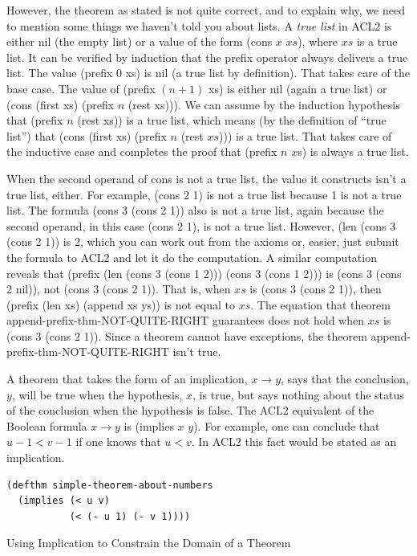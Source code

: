 However, the theorem as stated
is not quite correct,
and to explain why, we need to mention
some things we haven't told you about lists.
\label{true-list-def}
A \emph{true list} in ACL2 is either nil (the empty list)
or a value of the form (cons $x$ $xs$),
where $xs$ is a true list.
It can be verified by induction that
the prefix operator always delivers a true list.
The value (prefix 0 xs) is nil (a true list by definition).
That takes care of the base case.
The value of (prefix $(n+1)$ xs) is either nil (again a true list)
or (cons (first xs) (prefix $n$ (rest xs))).
We can assume by the induction hypothesis that
(prefix $n$ (rest xs)) is a true list,
which means (by the definition of ``true list'')
that (cons (first xs) (prefix $n$ (rest $xs$))) is a true list.
That takes care of the inductive case and completes the proof
that (prefix $n$ $x$s) is always a true list.

When the second operand of cons is not a true list,
the value it constructs isn't a true list, either.
For example, (cons 2 1) is not a true list because 1 is not a true list.
The formula (cons 3 (cons 2 1)) also is not a true list,
again because the second operand,
in this case (cons 2 1), is not a true list.
However, (len (cons 3 (cons 2 1)) is 2, which you can work
out from the axioms or, easier,
just submit the formula to ACL2 and let it do the computation.
A similar computation reveals that
(prefix (len (cons 3 (cons 1 2))) (cons 3 (cons 1 2)))
is (cons 3 (cons 2 nil)), not (cons 3 (cons 2 1)).
That is, when $xs$ is (cons 3 (cons 2 1)),
then (prefix (len xs) (append xs ys)) is not equal to $xs$.
The equation that theorem append-prefix-thm-NOT-QUITE-RIGHT
guarantees does not hold when $xs$ is (cons 3 (cons 2 1)).
Since a theorem cannot have exceptions,
the theorem append-prefix-thm-NOT-QUITE-RIGHT
isn't true.

\begin{aside}
A theorem that takes the form of an implication, $x \rightarrow y$,
says that the conclusion, $y$, will be true when the hypothesis, $x$,
is true, but says nothing about the status of the conclusion when
the hypothesis is false. The ACL2 equivalent of the Boolean formula $x \rightarrow y$
is (implies $x$ $y$).
For example, one can conclude that $u - 1 < v - 1$
if one knows that $u < v$.
In ACL2 this fact would be stated as an implication.
\begin{Verbatim}
(defthm simple-theorem-about-numbers
  (implies (< u v)
           (< (- u 1) (- v 1))))
\end{Verbatim}
\caption{Using Implication to Constrain the Domain of a Theorem}
\label{thm-with-implies}
\end{aside}

